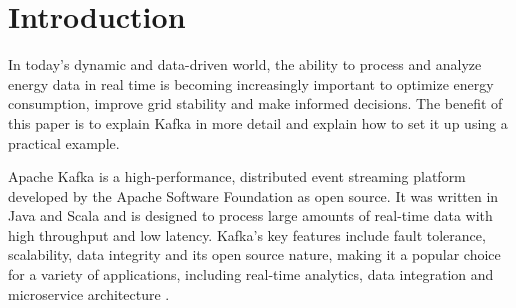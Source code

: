 \section{Introduction}
\label{cha:introduction}

In today's dynamic and data-driven world, the ability to process and analyze energy data in real time is becoming increasingly important to optimize energy consumption, improve grid stability and make informed decisions. The benefit of this paper is to explain Kafka in more detail and explain how to set it up using a practical example.

Apache Kafka is a high-performance, distributed event streaming platform developed by the Apache Software Foundation as open source. It was written in Java and Scala and is designed to process large amounts of real-time data with high throughput and low latency. Kafka's key features include fault tolerance, scalability, data integrity and its open source nature, making it a popular choice for a variety of applications, including real-time analytics, data integration and microservice architecture \cite{kafkaDoc}.